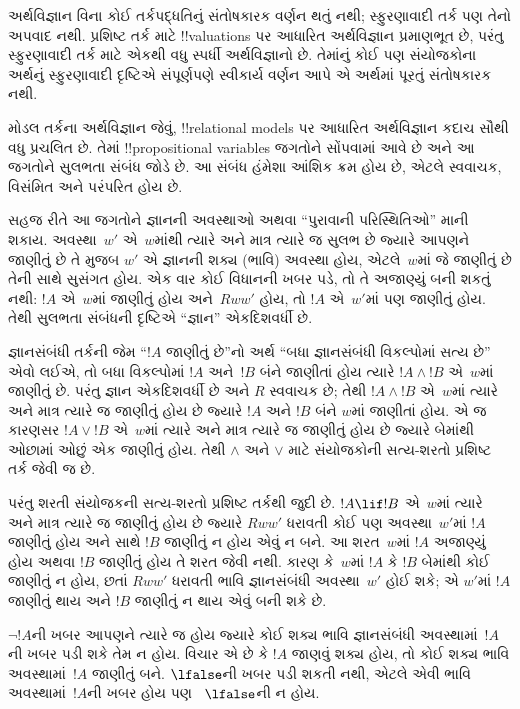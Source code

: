 \documentclass[../../../include/open-logic-section]{subfiles}
\begin{document}


અર્થવિજ્ઞાન વિના કોઈ તર્કપદ્ધતિનું સંતોષકારક વર્ણન થતું નથી;
સ્ફુરણાવાદી તર્ક પણ તેનો અપવાદ નથી. પ્રશિષ્ટ તર્ક માટે
!!{valuation}s પર આધારિત અર્થવિજ્ઞાન પ્રમાણભૂત છે, પરંતુ
સ્ફુરણાવાદી તર્ક માટે એકથી વધુ સ્પર્ધી અર્થવિજ્ઞાનો છે.
તેમાંનું કોઈ પણ સંયોજકોના અર્થનું સ્ફુરણાવાદી દૃષ્ટિએ
સંપૂર્ણપણે સ્વીકાર્ય વર્ણન આપે એ અર્થમાં પૂરતું સંતોષકારક નથી.

મોડલ તર્કના અર્થવિજ્ઞાન જેવું, !!{relational model}s પર
આધારિત અર્થવિજ્ઞાન કદાચ સૌથી વધુ પ્રચલિત છે. તેમાં
!!{propositional variable}s જગતોને સોંપવામાં આવે છે અને
આ જગતોને સુલભતા સંબંધ જોડે છે. આ સંબંધ હંમેશા આંશિક
ક્રમ હોય છે, એટલે સ્વવાચક, વિસંમિત અને પરંપરિત હોય છે.

સહજ રીતે આ જગતોને જ્ઞાનની અવસ્થાઓ અથવા ``પુરાવાની
પરિસ્થિતિઓ'' માની શકાય. અવસ્થા~$w'$ એ~$w$માંથી ત્યારે અને
માત્ર ત્યારે જ સુલભ છે જ્યારે આપણને જાણીતું છે તે મુજબ
$w'$ એ જ્ઞાનની શક્ય (ભાવિ) અવસ્થા હોય, એટલે~$w$માં
જે જાણીતું છે તેની સાથે સુસંગત હોય. એક વાર કોઈ વિધાનની
ખબર પડે, તો તે અજાણ્યું બની શકતું નથી: $!A$ એ~$w$માં
જાણીતું હોય અને~$Rww'$ હોય, તો $!A$ એ~$w'$માં પણ
જાણીતું હોય. તેથી સુલભતા સંબંધની દૃષ્ટિએ ``જ્ઞાન''
એકદિશવર્ધી છે.

જ્ઞાનસંબંધી તર્કની જેમ ``$!A$ જાણીતું છે''નો અર્થ
``બધા જ્ઞાનસંબંધી વિકલ્પોમાં સત્ય છે'' એવો લઈએ, તો
બધા વિકલ્પોમાં $!A$ અને~$!B$ બંને જાણીતાં હોય ત્યારે
$!A \land !B$ એ~$w$માં જાણીતું છે. પરંતુ જ્ઞાન
એકદિશવર્ધી છે અને $R$ સ્વવાચક છે; તેથી $!A \land !B$
એ~$w$માં ત્યારે અને માત્ર ત્યારે જ જાણીતું હોય છે જ્યારે
$!A$ અને $!B$ બંને $w$માં જાણીતાં હોય. એ જ કારણસર
$!A \lor !B$ એ~$w$માં ત્યારે અને માત્ર ત્યારે જ
જાણીતું હોય છે જ્યારે બેમાંથી ઓછામાં ઓછું એક જાણીતું હોય.
તેથી $\land$ અને $\lor$ માટે સંયોજકોની સત્ય-શરતો
પ્રશિષ્ટ તર્ક જેવી જ છે.

પરંતુ શરતી સંયોજકની સત્ય-શરતો પ્રશિષ્ટ તર્કથી જુદી છે.
$!A \lif !B$ એ~$w$માં ત્યારે અને માત્ર ત્યારે જ જાણીતું
હોય છે જ્યારે $Rww'$ ધરાવતી કોઈ પણ અવસ્થા~$w'$માં $!A$
જાણીતું હોય અને સાથે $!B$ જાણીતું ન હોય એવું ન બને.
આ શરત~$w$માં $!A$ અજાણ્યું હોય અથવા $!B$ જાણીતું
હોય તે શરત જેવી નથી. કારણ કે~$w$માં $!A$ કે $!B$
બેમાંથી કોઈ જાણીતું ન હોય, છતાં $Rww'$ ધરાવતી ભાવિ
જ્ઞાનસંબંધી અવસ્થા~$w'$ હોઈ શકે; એ $w'$માં $!A$
જાણીતું થાય અને $!B$ જાણીતું ન થાય એવું બની શકે છે.

$\lnot !A$ની ખબર આપણને ત્યારે જ હોય જ્યારે કોઈ શક્ય
ભાવિ જ્ઞાનસંબંધી અવસ્થામાં~$!A$ની ખબર પડી શકે તેમ ન હોય.
વિચાર એ છે કે $!A$ જાણવું શક્ય હોય, તો કોઈ શક્ય ભાવિ
અવસ્થામાં~$!A$ જાણીતું બને. $\lfalse$ની ખબર પડી શકતી
નથી, એટલે એવી ભાવિ અવસ્થામાં~$!A$ની ખબર હોય પણ
~$\lfalse$ની ન હોય.
\end{document}

